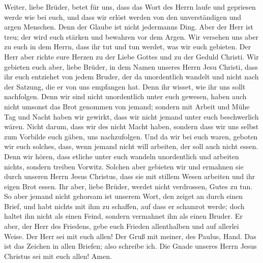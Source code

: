  Weiter, liebe Brüder, betet für uns, dass das Wort des
Herrn laufe und gepriesen werde wie bei euch,  und dass
wir erlöst werden von den unverständigen und argen Menschen. Denn der
Glaube ist nicht jedermanns Ding.  Aber der Herr ist treu;
der wird euch stärken und bewahren vor dem Argen.  Wir
versehen uns aber zu euch in dem Herrn, dass ihr tut und tun werdet, was
wir euch gebieten.  Der Herr aber richte eure Herzen zu
der Liebe Gottes und zu der Geduld Christi.  Wir gebieten
euch aber, liebe Brüder, in dem Namen unseres Herrn Jesu Christi, dass
ihr euch entziehet von jedem Bruder, der da unordentlich wandelt und
nicht nach der Satzung, die er von uns empfangen hat. 
Denn ihr wisset, wie ihr uns sollt nachfolgen. Denn wir sind nicht
unordentlich unter euch gewesen,  haben auch nicht umsonst
das Brot genommen von jemand; sondern mit Arbeit und Mühe Tag und Nacht
haben wir gewirkt, dass wir nicht jemand unter euch beschwerlich wären.
 Nicht darum, dass wir des nicht Macht haben, sondern dass
wir uns selbst zum Vorbilde euch gäben, uns nachzufolgen.
 Und da wir bei euch waren, geboten wir euch solches,
dass, wenn jemand nicht will arbeiten, der soll auch nicht essen.
 Denn wir hören, dass etliche unter euch wandeln
unordentlich und arbeiten nichts, sondern treiben Vorwitz.
 Solchen aber gebieten wir und ermahnen sie durch unseren
Herrn Jesus Christus, dass sie mit stillem Wesen arbeiten und ihr eigen
Brot essen.  Ihr aber, liebe Brüder, werdet nicht
verdrossen, Gutes zu tun.  So aber jemand nicht gehorsam
ist unserem Wort, den zeiget an durch einen Brief, und habt nichts mit
ihm zu schaffen, auf dass er schamrot werde;  doch haltet
ihn nicht als einen Feind, sondern vermahnet ihn als einen Bruder.
 Er aber, der Herr des Friedens, gebe euch Frieden
allenthalben und auf allerlei Weise. Der Herr sei mit euch allen!
 Der Gruß mit meiner, des Paulus, Hand. Das ist das
Zeichen in allen Briefen; also schreibe ich.  Die Gnade
unseres Herrn Jesus Christus sei mit euch allen! Amen.
